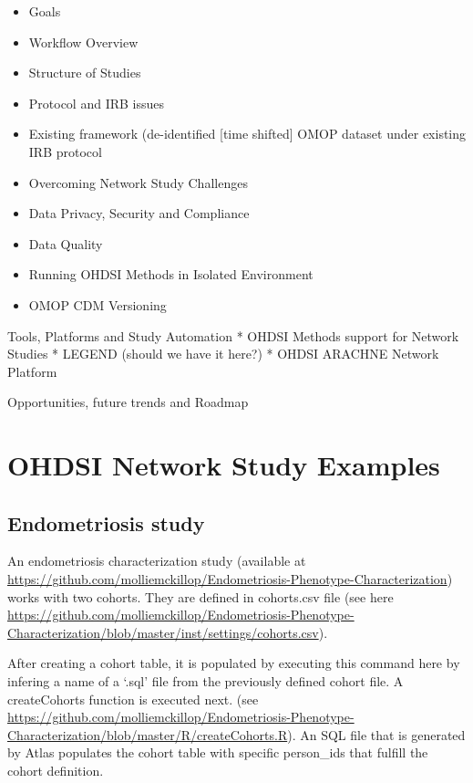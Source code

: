 \documentclass[]{book}
\providecommand{\tightlist}{%
  \setlength{\itemsep}{0pt}\setlength{\parskip}{0pt}}
\begin{document}
\begin{itemize}
\tightlist
\item
  Goals
\item
  Workflow Overview
\item
  Structure of Studies
\item
  Protocol and IRB issues
\item
  Existing framework (de-identified {[}time shifted{]} OMOP dataset
  under existing IRB protocol
\item
  Overcoming Network Study Challenges
\item
  Data Privacy, Security and Compliance
\item
  Data Quality
\item
  Running OHDSI Methods in Isolated Environment
\item
  OMOP CDM Versioning
\end{itemize}

Tools, Platforms and Study Automation * OHDSI Methods support for
Network Studies * LEGEND (should we have it here?) * OHDSI ARACHNE
Network Platform

Opportunities, future trends and Roadmap

\section{OHDSI Network Study
Examples}\label{ohdsi-network-study-examples}

\subsection{Endometriosis study}\label{endometriosis-study}

An endometriosis characterization study (available at
\url{https://github.com/molliemckillop/Endometriosis-Phenotype-Characterization})
works with two cohorts. They are defined in cohorts.csv file (see here
\url{https://github.com/molliemckillop/Endometriosis-Phenotype-Characterization/blob/master/inst/settings/cohorts.csv}).

After creating a cohort table, it is populated by executing this command
here by infering a name of a `.sql' file from the previously defined
cohort file. A createCohorts function is executed next. (see
\url{https://github.com/molliemckillop/Endometriosis-Phenotype-Characterization/blob/master/R/createCohorts.R}).
An SQL file that is generated by Atlas populates the cohort table with
specific person\_ids that fulfill the cohort definition.
\end{document}
